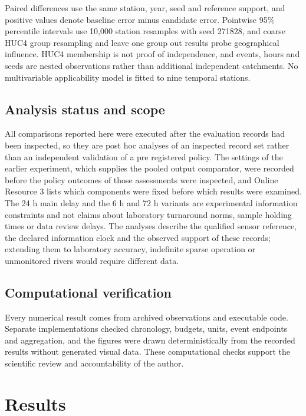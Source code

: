 \documentclass[lineno,pdflatex,sn-apa]{sn-jnl}%
\theoremstyle{thmstyleone}%
\theoremstyle{thmstyletwo}%
\theoremstyle{thmstylethree}%
\begin{document}
Paired differences use the same station, year, seed and reference support, and positive values denote baseline error minus candidate error. Pointwise 95\% percentile intervals use 10,000 station resamples with seed 271828, and coarse HUC4 group resampling and leave one group out results probe geographical influence. HUC4 membership is not proof of independence, and events, hours and seeds are nested observations rather than additional independent catchments. No multivariable applicability model is fitted to nine temporal stations.

\subsection{Analysis status and scope}

All comparisons reported here were executed after the evaluation records had been inspected, so they are post hoc analyses of an inspected record set rather than an independent validation of a pre registered policy. The settings of the earlier experiment, which supplies the pooled output comparator, were recorded before the policy outcomes of those assessments were inspected, and Online Resource 3 lists which components were fixed before which results were examined. The 24 h main delay and the 6 h and 72 h variants are experimental information constraints and not claims about laboratory turnaround norms, sample holding times or data review delays. The analyses describe the qualified sensor reference, the declared information clock and the observed support of these records; extending them to laboratory accuracy, indefinite sparse operation or unmonitored rivers would require different data.

\subsection{Computational verification}

Every numerical result comes from archived observations and executable code. Separate implementations checked chronology, budgets, units, event endpoints and aggregation, and the figures were drawn deterministically from the recorded results without generated visual data. These computational checks support the scientific review and accountability of the author.

\section{Results}\label{sec:results}
\end{document}
